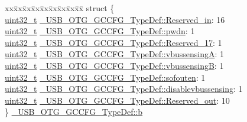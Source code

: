 \begin{DoxyCompactItemize}
\item 
\begin{tabbing}
xx\=xx\=xx\=xx\=xx\=xx\=xx\=xx\=xx\=\kill
struct \{\\
\>\hyperlink{stdint_8h_a435d1572bf3f880d55459d9805097f62}{uint32\_t} \hyperlink{group___u_s_b___o_t_g___d_r_i_v_e_r_ga8242aeaf1ab3d3578762591e4df7f75f}{\_USB\_OTG\_GCCFG\_TypeDef::Reserved\_in}: 16\\
\>\hyperlink{stdint_8h_a435d1572bf3f880d55459d9805097f62}{uint32\_t} \hyperlink{group___u_s_b___o_t_g___d_r_i_v_e_r_ga453a175b65a6fc8f96db36e504304c2b}{\_USB\_OTG\_GCCFG\_TypeDef::pwdn}: 1\\
\>\hyperlink{stdint_8h_a435d1572bf3f880d55459d9805097f62}{uint32\_t} \hyperlink{group___u_s_b___o_t_g___d_r_i_v_e_r_gae0cd177212dfd31bf75e1eee2f58ded7}{\_USB\_OTG\_GCCFG\_TypeDef::Reserved\_17}: 1\\
\>\hyperlink{stdint_8h_a435d1572bf3f880d55459d9805097f62}{uint32\_t} \hyperlink{group___u_s_b___o_t_g___d_r_i_v_e_r_gac18d70824581f11bbd03f2ef67b29b8d}{\_USB\_OTG\_GCCFG\_TypeDef::vbussensingA}: 1\\
\>\hyperlink{stdint_8h_a435d1572bf3f880d55459d9805097f62}{uint32\_t} \hyperlink{group___u_s_b___o_t_g___d_r_i_v_e_r_ga2be201bafae01439bca7d3c5c503e702}{\_USB\_OTG\_GCCFG\_TypeDef::vbussensingB}: 1\\
\>\hyperlink{stdint_8h_a435d1572bf3f880d55459d9805097f62}{uint32\_t} \hyperlink{group___u_s_b___o_t_g___d_r_i_v_e_r_gaee6a6008a6f826c15f2592bcba504bf8}{\_USB\_OTG\_GCCFG\_TypeDef::sofouten}: 1\\
\>\hyperlink{stdint_8h_a435d1572bf3f880d55459d9805097f62}{uint32\_t} \hyperlink{group___u_s_b___o_t_g___d_r_i_v_e_r_ga621c869741e314cdcdf1969b133e79af}{\_USB\_OTG\_GCCFG\_TypeDef::disablevbussensing}: 1\\
\>\hyperlink{stdint_8h_a435d1572bf3f880d55459d9805097f62}{uint32\_t} \hyperlink{group___u_s_b___o_t_g___d_r_i_v_e_r_gaca2c301103053094f91770ac5b6ddfc7}{\_USB\_OTG\_GCCFG\_TypeDef::Reserved\_out}: 10\\
\} \hyperlink{group___u_s_b___o_t_g___d_r_i_v_e_r_gacbc6de097009d1c0332acb2bf3c1885d}{\_USB\_OTG\_GCCFG\_TypeDef::b}\\


\end{tabbing}
\end{DoxyCompactItemize}
